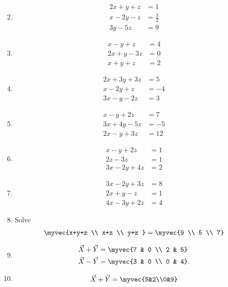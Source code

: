 \begin{multicols}{2}
\begin{enumerate}[label=\thesubsection.\arabic*,ref=\thesubsection.\theenumi]
\begin{align*}
\end{align*}
\item
\begin{align*}
 2x+y+z &= 1\\
 x-2y-z &= \frac{3}{2} \\
 3y-5z &= 9
\end{align*}
\item
\begin{align*}
 x-y+z &= 4\\
 2x+y-3z &= 0\\
 x+y+z &= 2
\end{align*}
\item
\begin{align*}
 2x+3y+3z &= 5\\
 x-2y+z &= -4\\
 3x-y-2z &= 3
\end{align*}
\item   \label{prob:14}
\begin{align*}
 x-y+2z &= 7\\
 3x+4y-5z &= -5\\
 2x-y+3z &= 12
\end{align*}
\item  
\begin{align*}
x-y+2z&=1\\ 2z-3z&=1\\ 3x-2y+4z&=2
\end{align*}
\item 
\begin{align*}
3x-2y+3z&=8\\ 2x+y-z&=1\\ 4x-3y+2z&=4
\end{align*}
\item Solve
\begin{align*}
\myvec
{x+y+z \\ x+z \\ y+z }=
\myvec{9 \\ 5 \\  7}
\end{align*}
\item 
\begin{align*}
	\vec{X}+\vec{Y}&= \myvec
{7 & 0 \\ 2 & 5} 
\\
		\vec{X}-\vec{Y}&=\myvec
{3 & 0 \\ 0 & 4}.
\end{align*}
\item  
\begin{align*}
\vec{X}+\vec{Y}=\myvec{5&2\\0&9}

\end{align*}
\end{enumerate}
\end{multicols}
